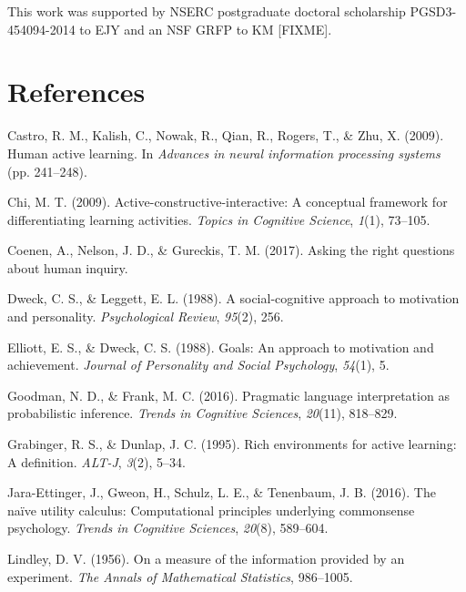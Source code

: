 \documentclass[10pt, letterpaper]{article}
\begin{document}
This work was supported by NSERC postgraduate doctoral scholarship
PGSD3-454094-2014 to EJY and an NSF GRFP to KM {[}FIXME{]}.

\section{References}\label{references}

\setlength{\parindent}{-0.1in} \setlength{\leftskip}{0.125in} \noindent

\hypertarget{refs}{}
\hypertarget{ref-castro2009human}{}
Castro, R. M., Kalish, C., Nowak, R., Qian, R., Rogers, T., \& Zhu, X.
(2009). Human active learning. In \emph{Advances in neural information
processing systems} (pp. 241--248).

\hypertarget{ref-chi2009active}{}
Chi, M. T. (2009). Active-constructive-interactive: A conceptual
framework for differentiating learning activities. \emph{Topics in
Cognitive Science}, \emph{1}(1), 73--105.

\hypertarget{ref-coenen2017}{}
Coenen, A., Nelson, J. D., \& Gureckis, T. M. (2017). Asking the right
questions about human inquiry.

\hypertarget{ref-dweck1988}{}
Dweck, C. S., \& Leggett, E. L. (1988). A social-cognitive approach to
motivation and personality. \emph{Psychological Review}, \emph{95}(2),
256.

\hypertarget{ref-elliott1988}{}
Elliott, E. S., \& Dweck, C. S. (1988). Goals: An approach to motivation
and achievement. \emph{Journal of Personality and Social Psychology},
\emph{54}(1), 5.

\hypertarget{ref-goodman2016}{}
Goodman, N. D., \& Frank, M. C. (2016). Pragmatic language
interpretation as probabilistic inference. \emph{Trends in Cognitive
Sciences}, \emph{20}(11), 818--829.

\hypertarget{ref-grabinger1995rich}{}
Grabinger, R. S., \& Dunlap, J. C. (1995). Rich environments for active
learning: A definition. \emph{ALT-J}, \emph{3}(2), 5--34.

\hypertarget{ref-jara2016}{}
Jara-Ettinger, J., Gweon, H., Schulz, L. E., \& Tenenbaum, J. B. (2016).
The naïve utility calculus: Computational principles underlying
commonsense psychology. \emph{Trends in Cognitive Sciences},
\emph{20}(8), 589--604.

\hypertarget{ref-lindley1956}{}
Lindley, D. V. (1956). On a measure of the information provided by an
experiment. \emph{The Annals of Mathematical Statistics}, 986--1005.
\end{document}
